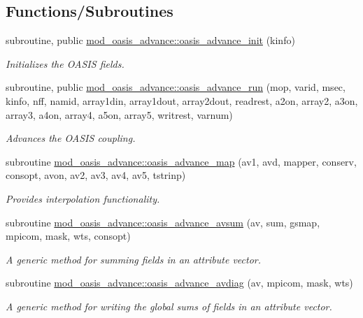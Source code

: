 \subsection*{Functions/\+Subroutines}
\begin{DoxyCompactItemize}
\item 
subroutine, public \hyperlink{namespacemod__oasis__advance_a480bfe5b333300c1084af8f9c239a81d}{mod\+\_\+oasis\+\_\+advance\+::oasis\+\_\+advance\+\_\+init} (kinfo)
\begin{DoxyCompactList}\small\item\em Initializes the O\+A\+S\+IS fields. \end{DoxyCompactList}\item 
subroutine, public \hyperlink{namespacemod__oasis__advance_a932b0cbe5d1f5fa27c283c6472be7baf}{mod\+\_\+oasis\+\_\+advance\+::oasis\+\_\+advance\+\_\+run} (mop, varid, msec, kinfo, nff, namid, array1din, array1dout, array2dout, readrest, a2on, array2, a3on, array3, a4on, array4, a5on, array5, writrest, varnum)
\begin{DoxyCompactList}\small\item\em Advances the O\+A\+S\+IS coupling. \end{DoxyCompactList}\item 
subroutine \hyperlink{namespacemod__oasis__advance_a0514c843d051b8ee16adfb349eaee6a7}{mod\+\_\+oasis\+\_\+advance\+::oasis\+\_\+advance\+\_\+map} (av1, avd, mapper, conserv, consopt, avon, av2, av3, av4, av5, tstrinp)
\begin{DoxyCompactList}\small\item\em Provides interpolation functionality. \end{DoxyCompactList}\item 
subroutine \hyperlink{namespacemod__oasis__advance_acf8f4a02082ba2d9f32f0835ad14e11d}{mod\+\_\+oasis\+\_\+advance\+::oasis\+\_\+advance\+\_\+avsum} (av, sum, gsmap, mpicom, mask, wts, consopt)
\begin{DoxyCompactList}\small\item\em A generic method for summing fields in an attribute vector. \end{DoxyCompactList}\item 
subroutine \hyperlink{namespacemod__oasis__advance_af611b26fe4601ded488fd5d3c03b12a2}{mod\+\_\+oasis\+\_\+advance\+::oasis\+\_\+advance\+\_\+avdiag} (av, mpicom, mask, wts)
\begin{DoxyCompactList}\small\item\em A generic method for writing the global sums of fields in an attribute vector. \end{DoxyCompactList}\end{DoxyCompactItemize}

